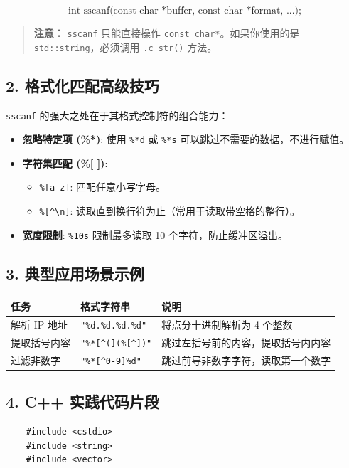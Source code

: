 \begin{itemize}
\[ \text{int sscanf(const char *buffer, const char *format, ...);} \]

\begin{quote}
	\textbf{注意：} \texttt{sscanf} 只能直接操作 \texttt{const char*}。如果你使用的是 \texttt{std::string}，必须调用 \texttt{.c\_str()} 方法。
\end{quote}

\subsection*{2. 格式化匹配高级技巧}
\texttt{sscanf} 的强大之处在于其格式控制符的组合能力：

\begin{itemize}
	\item \textbf{忽略特定项 (\%*)}: 
	使用 \texttt{\%*d} 或 \texttt{\%*s} 可以跳过不需要的数据，不进行赋值。
	\item \textbf{字符集匹配 (\%[ ])}:
	\begin{itemize}
		\item \texttt{\%[a-z]}: 匹配任意小写字母。
		\item \texttt{\%[\^{}\textbackslash n]}: 读取直到换行符为止（常用于读取带空格的整行）。
	\end{itemize}
	\item \textbf{宽度限制}: \texttt{\%10s} 限制最多读取 10 个字符，防止缓冲区溢出。
\end{itemize}

\subsection*{3. 典型应用场景示例}

\begin{table}[h]
	\centering
	\begin{tabular}{|l|l|l|}
		\hline
		\textbf{任务} & \textbf{格式字符串} & \textbf{说明} \\ \hline
		解析 IP 地址 & \texttt{"\%d.\%d.\%d.\%d"} & 将点分十进制解析为 4 个整数 \\ \hline
		提取括号内容 & \texttt{"\%*[\^{}(](\%[\^{}])"} & 跳过左括号前的内容，提取括号内内容 \\ \hline
		过滤非数字 & \texttt{"\%*[\^{}0-9]\%d"} & 跳过前导非数字字符，读取第一个数字 \\ \hline
	\end{tabular}
\end{table}

\subsection*{4. C++ 实践代码片段}
\begin{verbatim}
	#include <cstdio>
	#include <string>
	#include <vector>
	

\end{verbatim}
\end{itemize}
